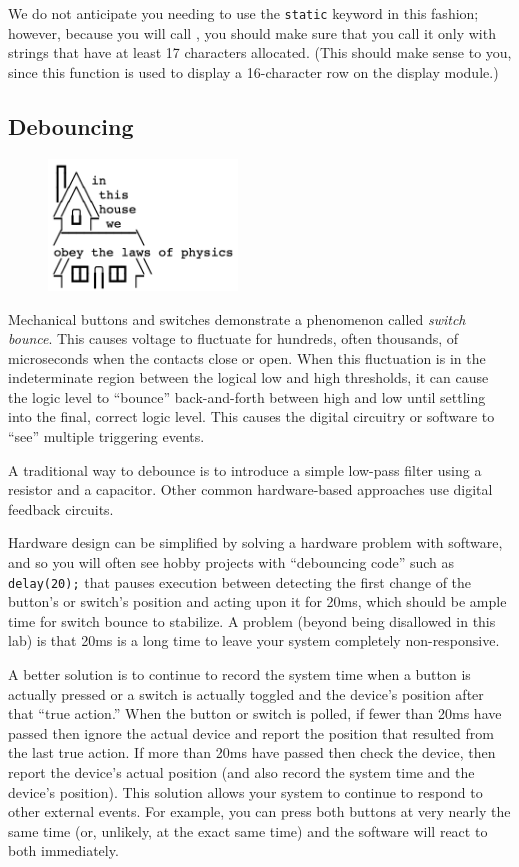 We do not anticipate you needing to use the \lstinline{static} keyword in this fashion;
however, because you will call , you should make sure that you call it only with strings that have at least 17 characters allocated.
(This should make sense to you, since this function is used to display a 16-character row on the display module.)


\subsection{Debouncing} \label{subsec:debouncing}

\begin{figure}[h]
    \centering
    \includegraphics[height=3.5cm]{in-this-house}
\end{figure}

Mechanical buttons and switches demonstrate a phenomenon called \textit{switch bounce}.
This causes voltage to fluctuate for hundreds, often thousands, of microseconds when the contacts close or open.
When this fluctuation is in the indeterminate region between the logical low and high thresholds, it can cause the logic level to ``bounce'' back-and-forth between high and low until settling into the final, correct logic level.
This causes the digital circuitry or software to ``see'' multiple triggering events.

A traditional way to debounce is to introduce a simple low-pass filter using a resistor and a capacitor.
Other common hardware-based approaches use digital feedback circuits.

Hardware design can be simplified by solving a hardware problem with software, and so you will often see hobby projects with ``debouncing code'' such as \lstinline{delay(20);} that pauses execution between detecting the first change of the button's or switch's position and acting upon it for 20ms, which should be ample time for switch bounce to stabilize.
A problem (beyond  being disallowed in this lab) is that 20ms is a long time to leave your system completely non-responsive.

A better solution is to continue to record the system time when a button is actually pressed or a switch is actually toggled and the device's position after that ``true action.''
When the button or switch is polled, if fewer than 20ms have passed then ignore the actual device and report the position that resulted from the last true action.
If more than 20ms have passed then check the device, then report the device's actual position (and also record the system time and the device's position).
This solution allows your system to continue to respond to other external events.
For example, you can press both buttons at very nearly the same time (or, unlikely, at the exact same time) and the software will react to both immediately.

